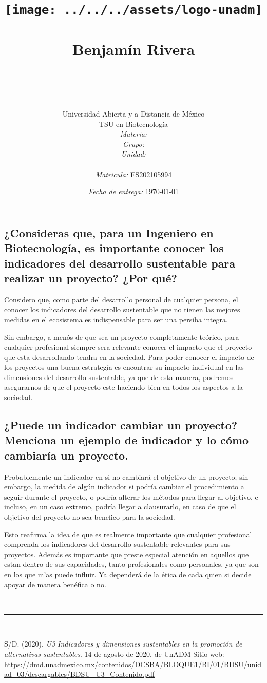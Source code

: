 \documentclass[12pt]{article}
\title{
	\texttt{[image: ../../../assets/logo-unadm]} \\
	\ \\ Benjam\'in Rivera \\
	\bf{\titulo}\\\ \\}
\author{
	Universidad Abierta y a Distancia de México \\
	TSU en Biotecnolog\'ia \\
	\textit{Materia:} \materia \\
	\textit{Grupo:} \grupo \\
	\textit{Unidad:} \unidad \\
	\\
	\textit{Matricula:} ES202105994 }
\date{\textit{Fecha de entrega:} \today}
\begin{document}
\maketitle\newpage

\subsection*{¿Consideras que, para un Ingeniero en Biotecnología, es importante conocer los indicadores del desarrollo sustentable para realizar un proyecto? ¿Por qué?}

	\par Considero que, como parte del desarrollo personal de cualquier persona, el conocer los indicadores del desarrollo sustentable que no tienen las mejores medidas en el ecosistema es indispensable para ser una persiba integra.
	\par Sin embargo, a men\'os de que sea un proyecto completamente te\'orico, para cualquier profesional siempre sera relevante conocer el impacto que el proyecto que esta desarrollando tendra en la sociedad. Para poder conocer el impacto de los proyectos una buena estrateg\'ia es encontrar su impacto individual en las dimensiones del desarrollo sustentable, ya que de esta manera, podremos asegurarnos de que el proyecto este haciendo bien en todos los aspectos a la sociedad.



\subsection*{¿Puede un indicador cambiar un proyecto? Menciona un ejemplo de indicador y lo cómo cambiaría un proyecto.}

	\par Probablemente un indicador en si no cambiar\'a el objetivo de un proyecto; sin embargo, la medida de alg\'un indicador si podr\'ia cambiar el procedimiento a seguir durante el proyecto, o podr\'ia alterar los m\'etodos para llegar al objetivo, e incluso, en un caso extremo, podr\'ia llegar a clausurarlo, en caso de que el objetivo del proyecto no sea benefico para la sociedad.
	\par Esto reafirma la idea de que es realmente importante que cualquier profesional comprenda los indicadores del desarrollo sustentable relevantes para sus proyectos. Adem\'as es importante que preste especial atenci\'on en aquellos que estan dentro de sus capacidades, tanto profesionales como personales, ya que son en los que m'as puede influir. Ya depender\'a de la \'etica de cada quien si decide apoyar de manera ben\'efica o no.

\ \\\hrule\
\begin{thebibliography}{X}
	 S/D. (2020). \emph{U3 \textbar{} Indicadores y dimensiones sustentables en la promoción de alternativas sustentables}. 14 de agosto de 2020, de UnADM Sitio web: \\\url{https://dmd.unadmexico.mx/contenidos/DCSBA/BLOQUE1/BI/01/BDSU/unidad_03/descargables/BDSU_U3_Contenido.pdf}
\end{thebibliography}
\end{document}
